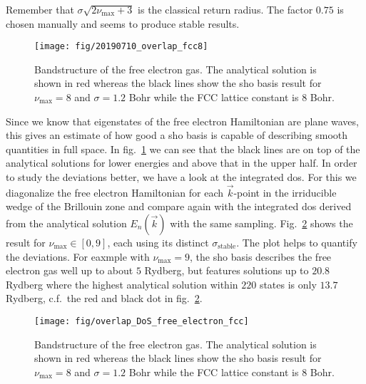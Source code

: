 \documentclass[oribibl]{llncs}
\newcommand{\um}[1]{_{\mathrm{#1}}}
\begin{document}
Remember that $\sigma \sqrt{2 \nu\um{max} + 3}$ is the classical return radius.
The factor $0.75$ is chosen manually and seems to produce stable results.
%
\begin{figure}
  \begin{minipage}[c]{.990\textwidth}
	\texttt{[image: fig/20190710\_overlap\_fcc8]} %
  \end{minipage}\hfill
  \begin{minipage}[c]{.009\textwidth}
  \end{minipage}
  \label{fig:overlap_fcc8}
  \caption{
	Bandstructure of the free electron gas. The analytical solution is shown in red
	whereas the black lines show the \ac{sho} basis result for $\nu\um{max} = 8$ and $\sigma = 1.2$ Bohr 
	while the FCC lattice constant is $8$ Bohr.
  }
\end{figure}
%
%
Since we know that eigenstates of the free electron Hamiltonian are plane waves,
this gives an estimate of how good a \ac{sho} basis is capable of describing
smooth quantities in full space. 
In fig.~\ref{fig:overlap_fcc8} we can see that the black lines are on top of the 
analytical solutions for lower energies and above that in the upper half.
In order to study the deviations better,
we have a look at the integrated \ac{dos}.
For this we diagonalize the free electron Hamiltonian for each $\vec k$-point
in the irriducible wedge of the Brillouin zone
and compare again with the integrated \ac{dos} derived from the analytical solution $E_n(\vec k)$
with the same sampling.
Fig.~\ref{fig:overlap_DoS_free_electron_fcc} shows the result for $\nu\um{max} \in [0, 9]$,
each using its distinct $\sigma\um{stable}$.
The plot helps to quantify the deviations. For eaxmple with $\nu\um{max} = 9$, the \ac{sho}
basis describes the free electron gas well up to about $5$ Rydberg, 
but features solutions up to $20.8$ Rydberg where the highest analytical solution
within $220$ states is only $13.7$ Rydberg,
c.f.~the red and black dot in fig.~\ref{fig:overlap_DoS_free_electron_fcc}.
%
\begin{figure}
  \begin{minipage}[c]{.990\textwidth}
	\texttt{[image: fig/overlap\_DoS\_free\_electron\_fcc]} %
  \end{minipage}\hfill
  \begin{minipage}[c]{.009\textwidth}
  \end{minipage}
  \label{fig:overlap_DoS_free_electron_fcc}
  \caption{
	Bandstructure of the free electron gas. The analytical solution is shown in red
	whereas the black lines show the \ac{sho} basis result for $\nu\um{max} = 8$ and $\sigma = 1.2$ Bohr 
	while the FCC lattice constant is $8$ Bohr.
  }
\end{figure}
%
%
\end{document}
